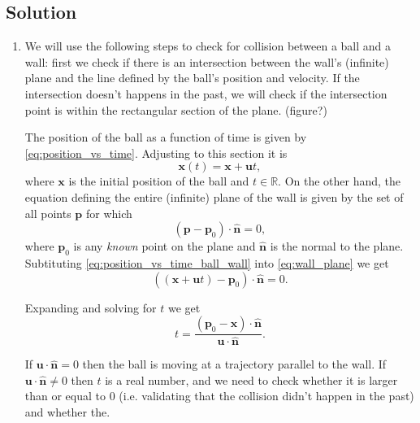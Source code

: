 \documentclass{article}
\renewcommand{\vec}[1]{\bm{#1}}
\newcommand{\bhat}[1]{\bm{\hat{#1}}}
\begin{document}
\subsection{Solution}
\begin{enumerate}
    \item We will use the following steps to check for collision between a ball and a wall: first we check if there is an intersection between the wall's (infinite) plane and the line defined by the ball's position and velocity. If the intersection doesn't happens in the past, we will check if the intersection point is within the rectangular section of the plane. (figure?)

        The position of the ball as a function of time is given by \autoref{eq:position_vs_time}. Adjusting to this section it is
        \begin{equation}
            \vec{x}(t) = \vec{x} + \vec{u}t,
            \label{eq:position_vs_time_ball_wall}
        \end{equation}
        where $\vec{x}$ is the initial position of the ball and $t\in\mathbb{R}$. On the other hand, the equation defining the entire (infinite) plane of the wall is given by the set of all points $\vec{p}$ for which
        \begin{equation}
            \left(\vec{p}-\vec{p}_{0}\right)\cdot \bhat{n} = 0,
            \label{eq:wall_plane}
        \end{equation}
        where $\vec{p}_{0}$ is any \textit{known} point on the plane and $\bhat{n}$ is the normal to the plane. Subtituting \autoref{eq:position_vs_time_ball_wall} into \autoref{eq:wall_plane} we get
        \begin{equation}
            \left(\left(\vec{x}+\vec{u}t\right)-\vec{p}_{0}\right)\cdot\bhat{n} = 0.
            \label{eq:line_plane_1}
        \end{equation}
        
        Expanding and solving for $t$ we get
        \begin{equation}
            t = \frac{\left(\vec{p}_{0}-\vec{x}\right)\cdot\bhat{n}}{\vec{u}\cdot\bhat{n}}.
            \label{eq:line_plane_2}
        \end{equation}

        If $\vec{u}\cdot\bhat{n}=0$ then the ball is moving at a trajectory parallel to the wall. If $\vec{u}\cdot\bhat{n}\neq0$ then $t$ is a real number, and we need to check whether it is larger than or equal to $0$ (i.e. validating that the collision didn't happen in the past) and whether the.
\end{enumerate}
\end{document}
